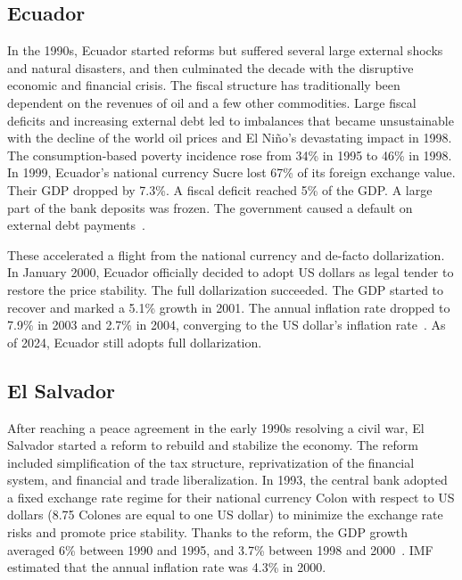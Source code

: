 \documentclass[dvipdfmx,a4paper]{article}
\begin{document}
\subsection{Ecuador}

In the 1990s, Ecuador started reforms but suffered several large external shocks and natural disasters, and then culminated the decade with the disruptive economic and financial crisis. The fiscal structure has traditionally been dependent on the revenues of oil and a few other commodities. Large fiscal deficits and increasing external debt led to imbalances that became unsustainable with the decline of the world oil prices and El Niño's devastating impact in 1998. The consumption-based poverty incidence rose from 34\% in 1995 to 46\% in 1998. In 1999, Ecuador's national currency Sucre lost 67\% of its foreign exchange value. Their GDP dropped by 7.3\%. A fiscal deficit reached 5\% of the GDP. A large part of the bank deposits was frozen. The government caused a default on external debt payments~\cite{beckerman2002crisis,quispe2006official,beckerman2001dollarization}.

These accelerated a flight from the national currency and de-facto dollarization. In January 2000, Ecuador officially decided to adopt US dollars as legal tender to restore the price stability. The full dollarization succeeded. The GDP started to recover and marked a 5.1\% growth in 2001. The annual inflation rate dropped to 7.9\% in 2003 and 2.7\% in 2004, converging to the US dollar's inflation rate~\cite{quispe2006official}. As of 2024, Ecuador still adopts full dollarization.

\subsection{El Salvador}

After reaching a peace agreement in the early 1990s resolving a civil war, El Salvador started a reform to rebuild and stabilize the economy. The reform included simplification of the tax structure, reprivatization of the financial system, and financial and trade liberalization. In 1993, the central bank adopted a fixed exchange rate regime for their national currency Colon with respect to US dollars (8.75 Colones are equal to one US dollar) to minimize the exchange rate risks and promote price stability. Thanks to the reform, the GDP growth averaged 6\% between 1990 and 1995, and 3.7\% between 1998 and 2000~\cite{quispe2006official}. IMF estimated that the annual inflation rate was 4.3\% in 2000.
\end{document}
